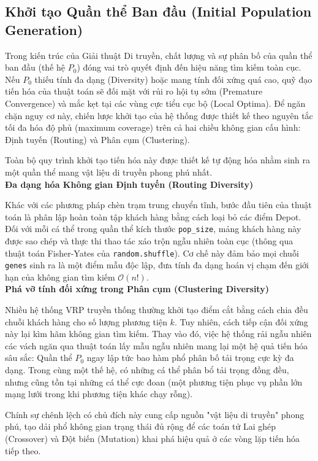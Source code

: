\documentclass[12pt,a4paper]{article}
\numberwithin{figure}{subsection}
\numberwithin{table}{subsection}
\begin{document}
\subsection{Khởi tạo Quần thể Ban đầu (Initial Population Generation)}
Trong kiến trúc của Giải thuật Di truyền, chất lượng và sự phân bố của quần thể ban đầu (thế hệ $P_0$) đóng vai trò quyết định đến hiệu năng tìm kiếm toàn cục. Nếu $P_0$ thiếu tính đa dạng (Diversity) hoặc mang tính đối xứng quá cao, quỹ đạo tiến hóa của thuật toán sẽ đối mặt với rủi ro hội tụ sớm (Premature Convergence) và mắc kẹt tại các vùng cực tiểu cục bộ (Local Optima). Để ngăn chặn nguy cơ này, chiến lược khởi tạo của hệ thống được thiết kế theo nguyên tắc tối đa hóa độ phủ (maximum coverage) trên cả hai chiều không gian cấu hình: Định tuyến (Routing) và Phân cụm (Clustering).

Toàn bộ quy trình khởi tạo tiến hóa này được thiết kế tự động hóa nhằm sinh ra một quần thể mang vật liệu di truyền phong phú nhất.\\

\noindent\textbf{Đa dạng hóa Không gian Định tuyến (Routing Diversity)}

Khác với các phương pháp chèn trạm trung chuyển tĩnh, bước đầu tiên của thuật toán là phân lập hoàn toàn tập khách hàng bằng cách loại bỏ các điểm Depot. Đối với mỗi cá thể trong quần thể kích thước \texttt{pop\_size}, mảng khách hàng này được sao chép và thực thi thao tác xáo trộn ngẫu nhiên toàn cục (thông qua thuật toán Fisher-Yates của \texttt{random.shuffle}). Cơ chế này đảm bảo mọi chuỗi \texttt{genes} sinh ra là một điểm mẫu độc lập, đưa tính đa dạng hoán vị chạm đến giới hạn của không gian tìm kiếm $\mathcal{O}(n!)$.\\

\noindent\textbf{Phá vỡ tính đối xứng trong Phân cụm (Clustering Diversity)}

Nhiều hệ thống VRP truyền thống thường khởi tạo điểm cắt bằng cách chia đều chuỗi khách hàng cho số lượng phương tiện $k$. Tuy nhiên, cách tiếp cận đối xứng này lại kìm hãm không gian tìm kiếm. Thay vào đó, việc hệ thống rải ngẫu nhiên các vách ngăn qua thuật toán lấy mẫu ngẫu nhiên mang lại một hệ quả tiến hóa sâu sắc: Quần thể $P_0$ ngay lập tức bao hàm phổ phân bố tải trọng cực kỳ đa dạng. Trong cùng một thế hệ, có những cá thể phân bổ tải trọng đồng đều, nhưng cũng tồn tại những cá thể cực đoan (một phương tiện phục vụ phần lớn mạng lưới trong khi phương tiện khác chạy rỗng).

Chính sự chênh lệch có chủ đích này cung cấp nguồn "vật liệu di truyền" phong phú, tạo dải phổ không gian trạng thái đủ rộng để các toán tử Lai ghép (Crossover) và Đột biến (Mutation) khai phá hiệu quả ở các vòng lặp tiến hóa tiếp theo.
\end{document}

